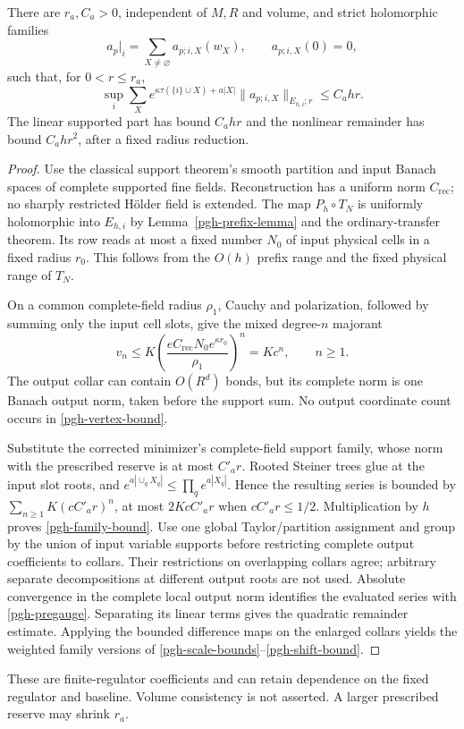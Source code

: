 \begin{proposition}
\label{pgh-support-proposition}
There are $r_a,C_a>0$, independent of $M,R$ and volume, and strict
holomorphic families
\begin{equation}
 a_p|_i=\sum_{X\ne\varnothing}a_{p;i,X}(w_X),\qquad
 a_{p;i,X}(0)=0,
 \label{pgh-family}
\end{equation}
such that, for $0<r\le r_a$,
\begin{equation}
 \sup_i\sum_X e^{\kappa\tau(\{i\}\cup X)+a|X|}
       \|a_{p;i,X}\|_{E_{h,i};r}\le C_a h r.
 \label{pgh-family-bound}
\end{equation}
The linear supported part has bound $C_ahr$ and the nonlinear
remainder has bound $C_ahr^2$, after a fixed radius reduction.
\end{proposition}
\begin{proof}
Use the classical support theorem's smooth partition and input
Banach spaces of complete supported fine fields. Reconstruction
has a uniform norm $C_{\mathrm{rec}}$; no sharply restricted
H\"older field is extended. The map $P_h\circ T_N$ is uniformly
holomorphic into $E_{h,i}$ by Lemma~\ref{pgh-prefix-lemma} and
the ordinary-transfer theorem. Its row reads at most a fixed
number $N_0$ of input physical cells in a fixed radius $r_0$.
This follows from the $O(h)$ prefix range and the fixed physical
range of $T_N$.

On a common complete-field radius $\rho_1$, Cauchy and
polarization, followed by summing only the input cell slots,
give the mixed degree-$n$ majorant
\begin{equation}
 v_n\le K
 \left(\frac{eC_{\mathrm{rec}}N_0e^{\kappa r_0}}{\rho_1}\right)^n
       =Kc^n,\qquad n\ge1.
 \label{pgh-vertex-bound}
\end{equation}
The output collar can contain $O(R^d)$ bonds, but its complete
norm is one Banach output norm, taken before the support sum.
No output coordinate count occurs in \eqref{pgh-vertex-bound}.

Substitute the corrected minimizer's complete-field support
family, whose norm with the prescribed reserve is at most
$C'_ar$. Rooted Steiner trees glue at the input slot roots,
and $e^{a|\cup_qX_q|}\le\prod_qe^{a|X_q|}$. Hence the resulting
series is bounded by $\sum_{n\ge1}K(cC'_ar)^n$, at most
$2KcC'_ar$ when $cC'_ar\le1/2$. Multiplication by $h$ proves
\eqref{pgh-family-bound}. Use one global Taylor/partition assignment
and group by the union of input variable supports before restricting
complete output coefficients to collars. Their restrictions on
overlapping collars agree; arbitrary separate decompositions at
different output roots are not used. Absolute convergence in the complete
local output norm identifies the evaluated series with
\eqref{pgh-pregauge}. Separating its linear terms gives the
quadratic remainder estimate. Applying the bounded difference
maps on the enlarged collars yields the weighted family versions
of \eqref{pgh-scale-bounds}--\eqref{pgh-shift-bound}.
\end{proof}
These are finite-regulator coefficients and can retain dependence
on the fixed regulator and baseline. Volume consistency is not
asserted. A larger prescribed reserve may shrink $r_a$.

